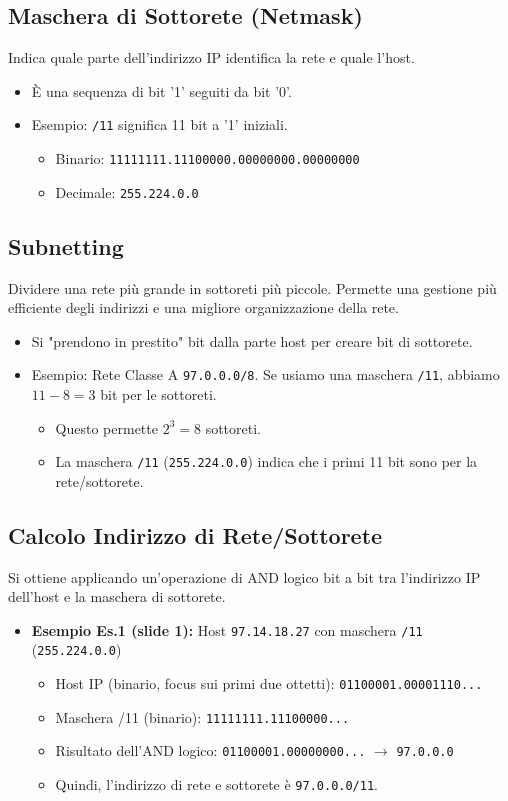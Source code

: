 \subsection{Maschera di Sottorete (Netmask)}
Indica quale parte dell'indirizzo IP identifica la rete e quale l'host.
\begin{itemize}
    \item È una sequenza di bit '1' seguiti da bit '0'.
    \item Esempio: \texttt{/11} significa 11 bit a '1' iniziali.
    \begin{itemize}
        \item Binario: \texttt{11111111.11100000.00000000.00000000}
        \item Decimale: \texttt{255.224.0.0}
    \end{itemize}
\end{itemize}

\subsection{Subnetting}
Dividere una rete più grande in sottoreti più piccole. Permette una gestione più efficiente degli indirizzi e una migliore organizzazione della rete.
\begin{itemize}
    \item Si "prendono in prestito" bit dalla parte host per creare bit di sottorete.
    \item Esempio: Rete Classe A \texttt{97.0.0.0/8}. Se usiamo una maschera \texttt{/11}, abbiamo $11 - 8 = 3$ bit per le sottoreti.
    \begin{itemize}
        \item Questo permette $2^3 = 8$ sottoreti.
        \item La maschera \texttt{/11} (\texttt{255.224.0.0}) indica che i primi 11 bit sono per la rete/sottorete.
    \end{itemize}
\end{itemize}

\subsection{Calcolo Indirizzo di Rete/Sottorete}
Si ottiene applicando un'operazione di AND logico bit a bit tra l'indirizzo IP dell'host e la maschera di sottorete.
\begin{itemize}
    \item \textbf{Esempio Es.1 (slide 1):} Host \texttt{97.14.18.27} con maschera \texttt{/11} (\texttt{255.224.0.0})
    \begin{itemize}
        \item Host IP (binario, focus sui primi due ottetti): \texttt{01100001.00001110...}
        \item Maschera /11 (binario): \texttt{11111111.11100000...}
        \item Risultato dell'AND logico: \texttt{01100001.00000000...} $\rightarrow$ \texttt{97.0.0.0}
        \item Quindi, l'indirizzo di rete e sottorete è \texttt{97.0.0.0/11}.
    \end{itemize}
\end{itemize}

